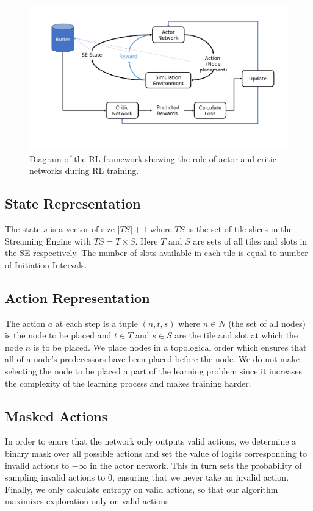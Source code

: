 \begin{figure}[tb]
  \centering
  \includegraphics[trim=15 30 20 20, clip, width=\linewidth]{fig/ppo.pdf}
  \caption{Diagram of the RL framework showing the role of actor and critic networks during RL training. }
  \label{fig:ppo}
\end{figure}

\subsection{State Representation}
The state $s$ is a vector of size $|TS|+1$ where $TS$ is the set of tile slices in the Streaming Engine with $TS=T \times S$. 
Here $T$ and $S$ are sets of all tiles and slots in the SE respectively. 
The number of slots available in each tile is equal to number of Initiation Intervals.

\subsection{Action Representation}
The action $a$ at each step is a tuple \((n,t,s)\) where $n \in N$ (the set of all nodes) is the node to be placed and $t \in T$ and $s \in S$ are the tile and slot at which the node $n$ is to be placed. 
We place nodes in a topological order which ensures that all of a node's predecessors have been placed before the node. 
We do not make selecting the node to be placed a part of the learning problem since it increases the complexity of the learning process and makes training harder.

\subsection{Masked Actions}
In order to enure that the network only outputs valid actions, we determine a binary mask over all possible actions and set the value of logits corresponding to invalid actions to $-\infty$ in the actor network. 
This in turn sets the probability of sampling invalid actions to $0$, ensuring that we never take an invalid action.
Finally, we only calculate entropy on valid actions, so that our algorithm maximizes exploration only on valid actions.

